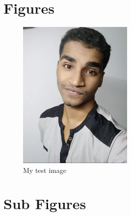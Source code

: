 \documentclass[a4paper, 12pt]{report}
\begin{document}
\section{Figures}

\begin{figure}[h!]
\centering
\includegraphics[width=0.5\textwidth]{jakir_hasan}
\caption{My test image}
\end{figure}

\section{Sub Figures}
\end{document}
